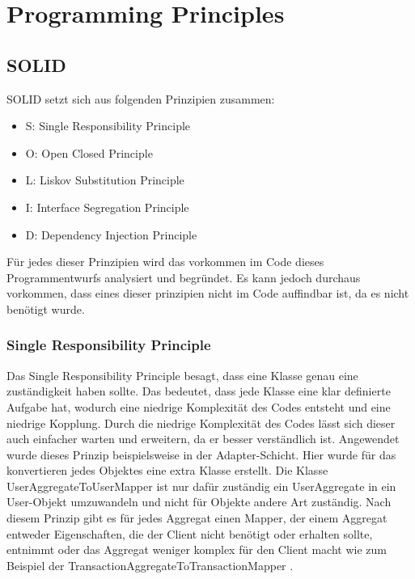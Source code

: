 \chapter{Programming Principles}
\section{SOLID}
SOLID setzt sich aus folgenden Prinzipien zusammen:
\begin{itemize}
    \item S: Single Responsibility Principle
    \item O: Open Closed Principle
    \item L: Liskov Substitution Principle
    \item I: Interface Segregation Principle
    \item D: Dependency Injection Principle
\end{itemize}
Für jedes dieser Prinzipien wird das vorkommen im Code dieses Programmentwurfs analysiert und begründet. Es kann jedoch durchaus vorkommen, dass eines dieser prinzipien nicht im Code auffindbar ist, da es nicht benötigt wurde.
\subsection{Single Responsibility Principle}
Das Single Responsibility Principle besagt, dass eine Klasse genau eine zuständigkeit haben sollte. Das bedeutet, dass jede Klasse eine klar definierte Aufgabe hat, wodurch eine niedrige Komplexität des Codes entsteht und eine niedrige Kopplung.
Durch die niedrige Komplexität des Codes lässt sich dieser auch einfacher warten und erweitern, da er besser verständlich ist.
\newline Angewendet wurde dieses Prinzip beispielsweise in der Adapter-Schicht. Hier wurde für das konvertieren jedes Objektes eine extra Klasse erstellt. Die Klasse \glqq UserAggregateToUserMapper \grqq ist nur dafür zuständig ein UserAggregate in ein User-Objekt umzuwandeln 
und nicht für Objekte andere Art zuständig. Nach diesem Prinzip gibt es für jedes Aggregat einen Mapper, der einem Aggregat entweder Eigenschaften, die der Client nicht benötigt oder erhalten sollte, entnimmt oder das Aggregat weniger komplex für den Client macht wie zum Beispiel der \glqq TransactionAggregateToTransactionMapper \grqq.
